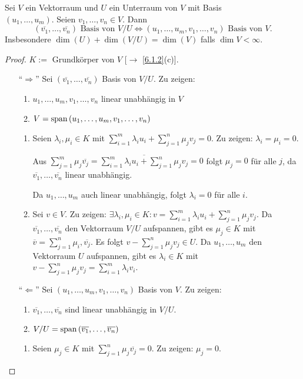 \documentclass[../../main.tex]{subfiles}
\begin{document}
\begin{lem}\label{8.1.11}
Sei $V$ ein Vektorraum und $U$ ein Unterraum von $V$ mit Basis \\
$(u_1,\ldots,u_m)$. Seien $v_1,\ldots,v_n\in V$. Dann $$(\overline{v_1},\ldots,\overline{v_n})\text{ Basis von }V/U\iff (u_1,\ldots,u_m,v_1,\ldots,v_n)\text{ Basis von }V.$$ Insbesondere $\dim(U)+\dim(V/U) = \dim(V)$ falls $\dim V< \infty$.
\end{lem}
\begin{proof}
$K:=$ Grundkörper von $V$ [$\to$ \ref{6.1.2}(c)].
\begin{itemize}
\item["`$\Longrightarrow$"'] Sei $(\overline{v_1},\ldots,\overline{v_n})$ Basis von $V/U$. Zu zeigen:
\begin{enumerate}[\normalfont(a)]
\item $u_1,\ldots,u_m,v_1,\ldots,v_n$ linear unabhängig in $V$
\item $V = \operatorname{span}\left(u_1,\ldots,u_m,v_1,\ldots,v_n\right)$
\end{enumerate}
\begin{enumerate}[Zu (a).]
\item Seien $\lambda_i,\mu_i\in K$ mit $\sum_{i = 1}^{m}\lambda_iu_i+\sum_{j = 1}^{n}\mu_jv_j = 0$. Zu zeigen: $\lambda_i = \mu_i = 0$.

Aus $\sum_{j = 1}^{m}\mu_j\overline{v_j} = \overline{\sum_{i = 1}^{m}\lambda_i u_i+\sum_{j = 1}^{n}\mu_jv_j} = 0$ folgt $\mu_j = 0$ für alle $j$, da $\overline{v_1},\ldots,\overline{v_n}$ linear unabhängig.

Da $u_1,\ldots,u_m$ auch linear unabhängig, folgt $\lambda_i = 0$ für alle $i$.
\item Sei $v\in V$. Zu zeigen: $\exists\lambda_i, \mu_i\in K: v = \sum_{i = 1}^{m}\lambda_iu_i+\sum_{j = 1}^{n}\mu_jv_j$. Da $\overline{v_1},\ldots,\overline{v_n}$ den Vektorraum $V/U$ aufspannen, gibt es $\mu_j\in K$ mit $\overline{v} = \sum_{j = 1}^{n}\mu_i,\overline{v_j}$. Es folgt $v-\sum_{j = 1}^{n}\mu_jv_j\in U$. Da $u_1,\ldots,u_m$ den Vektorraum $U$ aufspannen, gibt es $\lambda_i\in K$ mit $v-\sum_{j = 1}^{n}\mu_jv_j = \sum_{i = 1}^{m}\lambda_i v_i$.
\end{enumerate}
\item["`$\Longleftarrow$"'] Sei $(u_1,\ldots,u_m,v_1,\ldots,v_n)$ Basis von $V$. Zu zeigen:
\begin{enumerate}[\normalfont(a)]
\item $\overline{v_1},\ldots,\overline{v_n}$ sind linear unabhängig in $V/U$.
\item $V/U=\operatorname{span}\left(\overline{v_1},\ldots,\overline{v_n}\right)$
\end{enumerate}
\begin{enumerate}[Zu (a).]
\item Seien $\mu_j\in K$ mit $\sum_{j = 1}^{n}\mu_j \overline{v_j} = 0$. Zu zeigen: $\mu_j = 0$.


\end{enumerate}
\end{itemize}
\end{proof}
\end{document}
